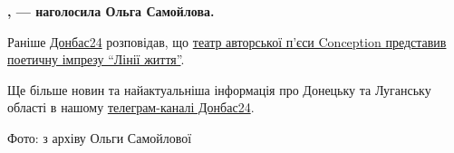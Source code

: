 \begin{leftbar}
	\begingroup
		\bfseries
{}, — наголосила Ольга Самойлова.
	\endgroup
\end{leftbar}

Раніше \href{https://donbas24.news}{Донбас24} розповідав, що \href{https://donbas24.news/news/teatr-avtorskoyi-pjesi-conception-predstaviv-poeticnu-imprezu-liniyi-zittya}{театр авторської п'єси Conception представив
поетичну імпрезу \enquote{Лінії життя}}.

Ще більше новин та найактуальніша інформація про Донецьку та Луганську області
в нашому \href{https://t.me/donbas24}{телеграм-каналі Донбас24}.

Фото: з архіву Ольги Самойлової

